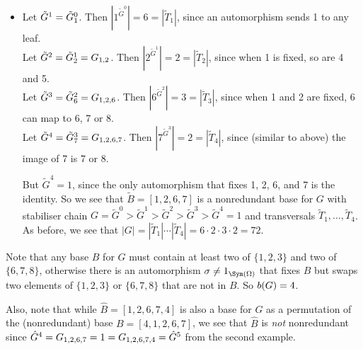 {\begin{example}
\begin{itemize}
                  But $G^5 = 1$, since the only automorphism that fixes 4, 1, 2, 6, and 7 is the identity. So we see that $B = [4,1,2,6,7]$ is a nonredundant base for $G$ with stabiliser chain $G = G^0 > G^1 > G^2 > G^3 > G^4 > G^5 = 1$ and associated transversals $T_1,\dotsc,T_5$. A strong generating set $S$ for $G$ is $\{(1,6)(2,7)(3,8)(4,5),(1,2),(1,3),(2,3),(6,7),(6,8),(7,8)\}$, with size 7. Moreover, from \autoref{prop:stabiliser_chain_indexes}, we see that $|G| = |T_1| \dotsb |T_5| = 2 \cdot 3 \cdot 2 \cdot 3 \cdot 2 = 72$, so there are 72 automorphisms (relabellings) of $\Gamma$. %
            \item Let $\tilde G^1 = \added{2}{\tilde G^0_{1}}$. Then $|1^{\tilde G^0}| = 6 = |\tilde T_1|$, since an automorphism sends 1 to any leaf. \\
                  Let $\tilde G^2 = \added{2}{\tilde G^1_{2}} = \added{2}{G_{1,2}}$. Then $|2^{\tilde G^1}| = 2 = |\tilde T_2|$, since when 1 is fixed, so are 4 and 5. \\
                  Let $\tilde G^3 = \added{2}{\tilde G^2_{6}} = \added{2}{G_{1,2,6}}$. Then $|6^{\tilde G^2}| = 3 = |\tilde T_3|$, since when 1 and 2 are fixed, 6 can map to 6, 7 or 8. \\
                  Let $\tilde G^4 = \added{2}{\tilde G^3_{7}} = \added{2}{G_{1,2,6,7}}$. Then $|7^{\tilde G^3}| = 2 = |\tilde T_4|$, since (similar to above) the image of 7 is 7 or 8.

                  But $\tilde G^4 = 1$, since the only automorphism that fixes 1, 2, 6, and 7 is the identity. So we see that $\tilde B = [1,2,6,7]$ is a nonredundant base for $G$ with stabiliser chain $G = \tilde G^0 > \tilde G^1 > \tilde G^2 > \tilde G^3 > \tilde G^4 = 1$ and transversals $\tilde T_1,\dotsc,\tilde T_4$. As before, we see that $|G| = |\tilde T_1| \dotsb |\tilde T_4| = 6 \cdot 2 \cdot 3 \cdot 2 = 72$. %
        \end{itemize}
        Note that any base $B$ for $G$ must contain at least two of $\{1,2,3\}$ and two of $\{6,7,8\}$, otherwise there is an automorphism $\sigma \neq 1_{\Sym(\Omega)}$ that fixes $B$ but swaps two elements of $\{1,2,3\}$ or $\{6,7,8\}$ that are not in $B$. So $\added{2}{b(G)} = 4$.

        Also, note that while $\hat B = [1,2,6,7,4]$ is also a base for $G$ as a permutation of the (nonredundant) base $B = [4,1,2,6,7]$, we see that $\hat B$ is \textit{not} nonredundant since $\hat G^4 = \added{2}{G_{1,2,6,7}} = 1 = \added{2}{G_{1,2,6,7,4}} = \hat G^5$ from the second example.
    \end{example}}

